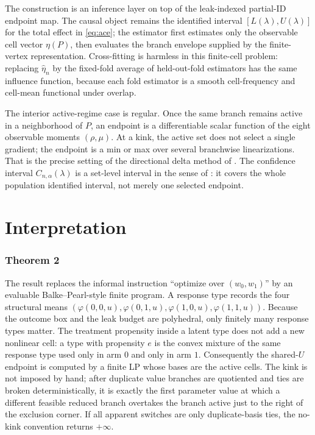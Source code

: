 \documentclass[11pt]{article}
\theoremstyle{definition}
\theoremstyle{plain}
\theoremstyle{remark}
\begin{document}
The construction is an inference layer on top of the leak-indexed partial-ID endpoint map. The causal object remains the identified interval \([L(\lambda),U(\lambda)]\) for the total effect in \eqref{eq:ace}; the estimator first estimates only the observable cell vector \(\eta(P)\), then evaluates the branch envelope supplied by the finite-vertex representation. Cross-fitting is harmless in this finite-cell problem: replacing \(\widehat\eta_n\) by the fixed-fold average of held-out-fold estimators has the same influence function, because each fold estimator is a smooth cell-frequency and cell-mean functional under overlap.

The interior active-regime case is regular. Once the same branch remains active in a neighborhood of \(P\), an endpoint is a differentiable scalar function of the eight observable moments \((\rho,\mu)\). At a kink, the active set does not select a single gradient; the endpoint is a min or max over several branchwise linearizations. That is the precise setting of the directional delta method of \citet{FangSantos2019DirectionallyDifferentiable}. The confidence interval \(C_{n,\alpha}(\lambda)\) is a set-level interval in the sense of \citet{ChernozhukovHongTamer2007ParameterSets}: it covers the whole population identified interval, not merely one selected endpoint.

\section{Interpretation}
\subsubsection*{Theorem 2}
The result replaces the informal instruction ``optimize over \((w_0,w_1)\)'' by an evaluable Balke--Pearl-style finite program. A response type records the four structural means \((\varphi(0,0,u),\varphi(0,1,u),\varphi(1,0,u),\varphi(1,1,u))\). Because the outcome box and the leak budget are polyhedral, only finitely many response types matter. The treatment propensity inside a latent type does not add a new nonlinear cell: a type with propensity \(e\) is the convex mixture of the same response type used only in arm \(0\) and only in arm \(1\). Consequently the shared-\(U\) endpoint is computed by a finite LP whose bases are the active cells. The kink is not imposed by hand; after duplicate value branches are quotiented and ties are broken deterministically, it is exactly the first parameter value at which a different feasible reduced branch overtakes the branch active just to the right of the exclusion corner. If all apparent switches are only duplicate-basis ties, the no-kink convention returns \(+\infty\).
\end{document}
